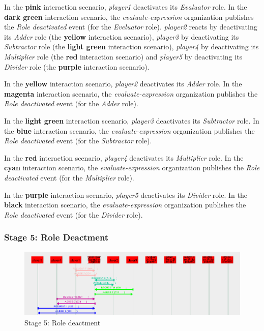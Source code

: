 In the \textbf{pink} interaction scenario, \textit{player1} deactivates its \textit{Evaluator} role.
In the \textbf{dark green} interaction scenario, the \textit{evaluate-expression} organization publishes the \textit{Role deactivated} event (for the \textit{Eveluator} role).
\textit{player2} reacts by deactivating its \textit{Adder} role (the \textbf{yellow} interaction scenario), \textit{player3} by deactivating its \textit{Subtractor} role (the \textbf{light green} interaction scenario), \textit{player4} by deactivating its \textit{Multiplier} role (the \textbf{red} interaction scenario) and \textit{player5} by deactivating its \textit{Divider} role (the \textbf{purple} interaction scenario).

In the \textbf{yellow} interaction scenario, \textit{player2} deactivates its \textit{Adder} role.
In the \textbf{magenta} interaction scenario, the \textit{evaluate-expression} organization publishes the \textit{Role deactivated} event (for the \textit{Adder} role).

In the \textbf{light green} interaction scenario, \textit{player3} deactivates its \textit{Subtractor} role.
In the \textbf{blue} interaction scenario, the \textit{evaluate-expression} organization publishes the \textit{Role deactivated} event (for the \textit{Subtractor} role).

In the \textbf{red} interaction scenario, \textit{player4} deactivates its \textit{Multiplier} role.
In the \textbf{cyan} interaction scenario, the \textit{evaluate-expression} organization publishes the \textit{Role deactivated} event (for the \textit{Multiplier} role).

In the \textbf{purple} interaction scenario, \textit{player5} deactivates its \textit{Divider} role.
In the \textbf{black} interaction scenario, the \textit{evaluate-expression} organization publishes the \textit{Role deactivated} event (for the \textit{Divider} role).

\subsubsection*{Stage 5: Role Deactment}

\begin{figure}[H]
	\centering
	\includegraphics[width=\textwidth]{images/examples/example2-stage5.png}
	\caption{Stage 5: Role deactment}
	\label{figure:example2-stage5}
\end{figure} 


